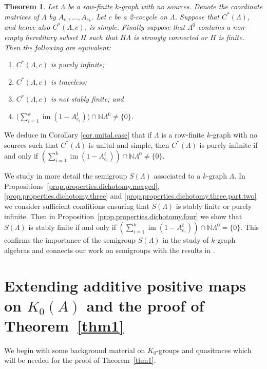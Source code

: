 \documentclass[a4paper, 12pt]{amsart}
\numberwithin{equation}{section}
\newcounter{theorem}
\newtheorem{thm}[theorem]{Theorem}
\theoremstyle{remark}
\theoremstyle{definition}
\begin{document}
\begin{thm}\label{thm4}
Let $\Lambda$ be a row-finite $k$-graph with no sources. Denote the
coordinate matrices of $\Lambda$ by $A_{e_1}, \dots , A_{e_k}$. Let $c$ be a 2-cocycle on
$\Lambda$.  Suppose that $C^*(\Lambda)$, and
hence also $C^*(\Lambda,c)$, is simple. Finally suppose that $\Lambda^0$ contains a non-empty
hereditary subset $H$ such that $H\Lambda$ is strongly connected or $H$ is finite. Then
the following are equivalent:
\begin{enumerate}
\item $C^*(\Lambda, c)$ is purely infinite;
\item $C^*(\Lambda, c)$ is traceless;
\item $C^*(\Lambda, c)$ is not stably finite; and
\item $\big(\sum_{i=1}^k{\operatorname{im}}(1-A^t_{e_i}) \big) \cap {\mathbb{N}}{\Lambda^0} \neq \{0\}$.
\end{enumerate}
\end{thm}

We deduce in Corollary \ref{cor.unital.case} that if $\Lambda$
is a row-finite $k$-graph with no sources such that $C^*(\Lambda)$ is unital and simple,
then $C^*(\Lambda)$ is purely infinite if and only if $(\sum_{i=1}^k{\operatorname{im}}(1-A^t_{e_i})) \cap
{\mathbb{N}}{\Lambda^0}\neq \{0\}$.

We study in more detail the semigroup $S(\Lambda)$ associated to a $k$-graph $\Lambda$.
In Propositions~\ref{prop.properties.dichotomy.merged},
\ref{prop.properties.dichotomy.three} and \ref{prop.properties.dichotomy.three.part.two}
we consider sufficient conditions ensuring that $S(\Lambda)$ is stably finite or purely
infinite. Then in  Proposition~\ref{prop.properties.dichotomy.four} we show that
$S(\Lambda)$ is stably finite if and only if $(\sum_{i=1}^k{\operatorname{im}}(1-A^t_{e_i})) \cap
{\mathbb{N}}{\Lambda^0} = \{0\}$. This confirms the importance of the semigroup $S(\Lambda)$ in
the study of $k$-graph algebras and connects our work on semigroups with the results in
\cite{MR3507995}.


\section{Extending additive positive maps on \texorpdfstring{$K_0(A)$}{K0(A)} and the proof of Theorem~\ref{thm1}}\label{section1}

We begin with some background material on $K_0$-groups and quasitraces which will be
needed for the proof of Theorem~\ref{thm1}.
\end{document}
